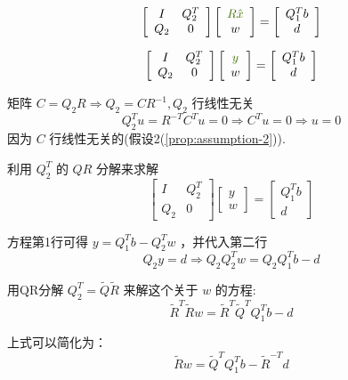 $$\displaystyle \left[\begin{array}{ c c }
    I & Q_{2}^{T}\\
    Q_{2} & 0
    \end{array}\right]\left[\begin{array}{ c }
    \textcolor[rgb]{0.25,0.46,0.02}{R\hat{x}}\\
    w
    \end{array}\right] =\left[\begin{array}{ c }
    Q_{1}^{T} b\\
    d
    \end{array}\right]$$

$$\displaystyle \left[\begin{array}{ c c }
    I & Q_{2}^{T}\\
    Q_{2} & 0
    \end{array}\right]\left[\begin{array}{ c }
    \textcolor[rgb]{0.25,0.46,0.02}{y}\\
    w
    \end{array}\right] =\left[\begin{array}{ c }
    Q_{1}^{T} b\\
    d
    \end{array}\right]$$


矩阵 $ C=Q_{2} R \Rightarrow Q_{2}=C R^{-1}, Q_{2} $ 行线性无关
$$
Q_{2}^{T} u=R^{-T} C^{T} u=0  \Rightarrow  C^{T} u=0 \Rightarrow  u=0
$$
因为 $ C $ 行线性无关的(假设2(\ref{prop:assumption-2})).

利用 $ Q_{2}^{T} $ 的 $ Q R $ 分解来求解
$$
\left[\begin{array}{cc}
I & Q_{2}^{T} \\
Q_{2} & 0
\end{array}\right]\left[\begin{array}{l}
y \\
w
\end{array}\right]=\left[\begin{array}{c}
Q_{1}^{T} b \\
d
\end{array}\right]
$$

方程第1行可得 $ y=Q_{1}^{T} b-Q_{2}^{T} w $ ，并代入第二行
$$
Q_{2} y=d \Rightarrow Q_{2} Q_{2}^{T} w=Q_{2} Q_{1}^{T} b-d
$$

用QR分解 $ Q_{2}^{T}=\tilde{Q} \tilde{R} $ 来解这个关于 $ w $ 的方程:
$$
\tilde{R}^{T} \tilde{R} w=\tilde{R}^{T} \tilde{Q}^{T} Q_{1}^{T} b-d
$$

上式可以简化为：
$$
\tilde{R} w=\tilde{Q}^{T} Q_{1}^{T} b-\tilde{R}^{-T} d
$$

